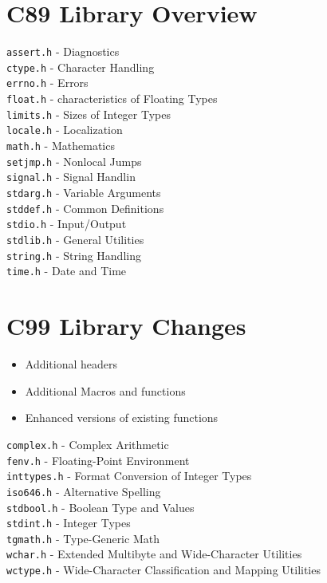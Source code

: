 \documentclass[openany]{book}
\begin{document}
    \section{C89 Library Overview}
    \texttt{assert.h} - Diagnostics \\
    \texttt{ctype.h} - Character Handling \\
    \texttt{errno.h} - Errors \\
    \texttt{float.h} - characteristics of Floating Types \\
    \texttt{limits.h} - Sizes of Integer Types \\
    \texttt{locale.h} - Localization \\
    \texttt{math.h} - Mathematics \\
    \texttt{setjmp.h} - Nonlocal Jumps \\
    \texttt{signal.h} - Signal Handlin \\
    \texttt{stdarg.h} - Variable Arguments \\
    \texttt{stddef.h} - Common Definitions \\
    \texttt{stdio.h} - Input/Output \\
    \texttt{stdlib.h} - General Utilities \\
    \texttt{string.h} - String Handling \\
    \texttt{time.h} - Date and Time \\

    \section{C99 Library Changes}
    \begin{itemize}
        \item Additional headers
        \item Additional Macros and functions
        \item Enhanced versions of existing functions
    \end{itemize}

    \texttt{complex.h} - Complex Arithmetic \\
    \texttt{fenv.h} - Floating-Point Environment \\
    \texttt{inttypes.h} - Format Conversion of Integer Types \\
    \texttt{iso646.h} - Alternative Spelling \\
    \texttt{stdbool.h} - Boolean Type and Values \\
    \texttt{stdint.h} - Integer Types \\
    \texttt{tgmath.h} - Type-Generic Math \\
    \texttt{wchar.h} - Extended Multibyte and Wide-Character Utilities \\
    \texttt{wctype.h} - Wide-Character Classification and Mapping Utilities \\
\end{document}
